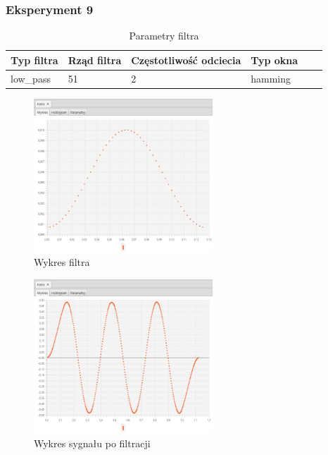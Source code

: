 \documentclass[12pt]{article}
\begin{document}
{{            \subsubsection{Eksperyment 9} {
                \begin{table}[H]
                \centering
                \begin{tabular}{|l|l|l|l|l|l|}
                \hline
                Typ filtra & Rząd filtra & Częstotliwość odciecia & Typ okna  \\\hline
                low\_pass & 51 & 2 & hamming     \\\hline
                \end{tabular}
                \caption{Parametry filtra}
                \end{table}
                \begin{figure}[H]
                \centering
                \includegraphics[width=0.6\textwidth]{img/result/filter/experiment09/data_draw_3b_filter_data_114048.png}
                \caption{Wykres filtra}
                \end{figure}

                \begin{figure}[H]
                \centering
                \includegraphics[width=0.6\textwidth]{img/result/filter/experiment09/data_draw_3b_result_data_114051.png}
                \caption{Wykres sygnału po filtracji}
                \end{figure}
            }
            \newpage

}}
\end{document}
